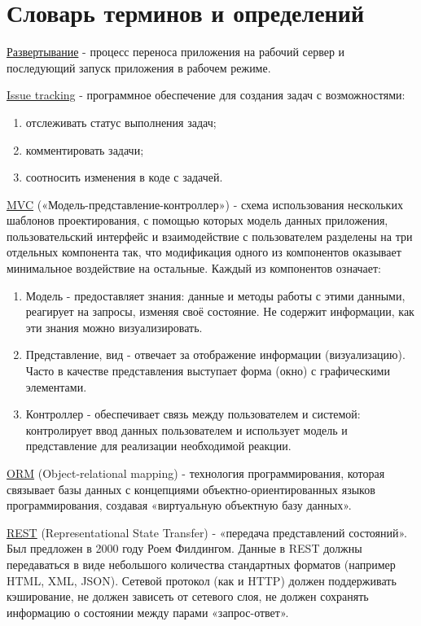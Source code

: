 \newpage
\section*{Словарь терминов и определений}
\underline{Развертывание} - процесс переноса приложения на рабочий сервер и
последующий запуск приложения в рабочем режиме.

\underline{Issue tracking} - программное обеспечение для создания задач с
возможностями:
\begin{enumerate}
  \item отслеживать статус выполнения задач;
  \item комментировать задачи;
  \item соотносить изменения в коде с задачей.
\end{enumerate}

\underline{MVC} («Модель-представление-контроллер») - схема использования
нескольких шаблонов проектирования, с помощью которых модель данных приложения,
пользовательский интерфейс и взаимодействие с пользователем разделены на три
отдельных компонента так, что модификация одного из компонентов оказывает
минимальное воздействие на остальные.  Каждый из компонентов означает:
\begin{enumerate}
  \item Модель - предоставляет знания: данные и методы работы с этими данными, реагирует на запросы, изменяя своё состояние. Не содержит информации, как эти знания можно визуализировать.
  \item Представление, вид - отвечает за отображение информации (визуализацию).
Часто в качестве представления выступает форма (окно) с графическими элементами.
  \item Контроллер - обеспечивает связь между пользователем и системой:
контролирует ввод данных пользователем и использует модель и представление для реализации необходимой реакции.   
\end{enumerate}

\underline{ORM} (Object-relational mapping) - технология программирования,
которая связывает базы данных с концепциями объектно-ориентированных языков
программирования, создавая «виртуальную объектную базу данных».

\underline{REST} (Representational State Transfer) - «передача представлений
состояний».
Был предложен в 2000 году Роем Филдингом. Данные в REST должны передаваться в
виде небольшого количества стандартных форматов (например HTML, XML, JSON).
Сетевой протокол (как и HTTP) должен поддерживать кэширование, не должен
зависеть от сетевого слоя, не должен сохранять информацию о состоянии между
парами «запрос-ответ».

